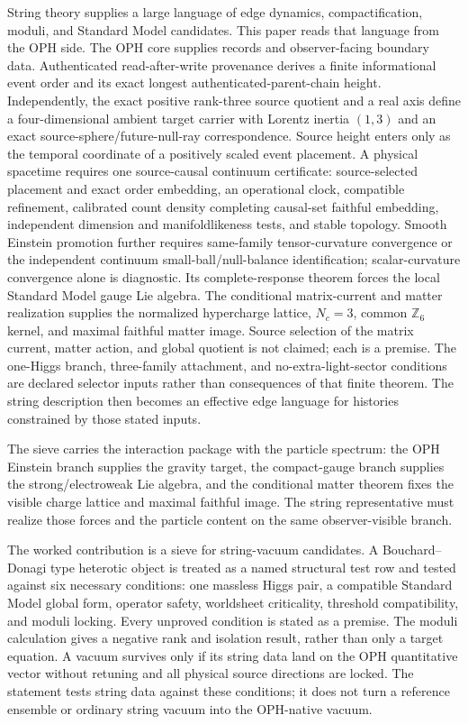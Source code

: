 \documentclass[11pt]{article}
\theoremstyle{remark}
\theoremstyle{plain}
\begin{document}
String theory supplies a large language of edge dynamics, compactification,
moduli, and Standard Model candidates. This paper reads that language from the
OPH side. The OPH core supplies records and observer-facing boundary data.
Authenticated read-after-write provenance derives a finite informational event
order and its exact longest authenticated-parent-chain height. Independently, the exact
positive rank-three source quotient and a real axis define a four-dimensional ambient target
carrier with Lorentz inertia \((1,3)\) and an exact source-sphere/future-null-ray
correspondence. Source height enters only as the temporal coordinate of a
positively scaled event placement. A physical spacetime requires one source-causal
continuum certificate: source-selected placement and exact order embedding,
an operational clock, compatible refinement, calibrated count density
completing causal-set faithful embedding, independent dimension and
manifoldlikeness tests, and stable topology. Smooth Einstein promotion further
requires same-family tensor-curvature convergence or the independent continuum
small-ball/null-balance identification; scalar-curvature convergence alone is
diagnostic. Its
complete-response theorem forces the local Standard Model gauge Lie algebra.
The conditional matrix-current and matter realization supplies the
normalized hypercharge lattice, \(N_c=3\), common \(\mathbb Z_6\) kernel, and
maximal faithful matter image. Source selection of the matrix current, matter
action, and global quotient is not claimed; each is a premise. The one-Higgs
branch, three-family attachment, and no-extra-light-sector conditions are declared selector
inputs rather than consequences of that finite theorem. The string description then becomes an
effective edge language for histories constrained by those stated inputs.

The sieve carries the interaction package with the particle spectrum:
the OPH Einstein branch supplies the gravity target, the compact-gauge branch supplies the
strong/electroweak Lie algebra, and the conditional matter theorem fixes the visible
charge lattice and maximal faithful image.
The string representative must realize those forces and the particle content on the same
observer-visible branch.

The worked contribution is a sieve for string-vacuum candidates. A
Bouchard--Donagi type heterotic object is treated as a named structural test row and
tested against six necessary conditions: one massless Higgs pair, a compatible Standard Model global form,
operator safety, worldsheet criticality, threshold compatibility, and moduli locking. Every
unproved condition is stated as a premise. The moduli calculation gives a negative rank and isolation result,
rather than only a target equation. A vacuum survives only if its string data land on the OPH
quantitative vector without retuning and all physical source directions are locked. The statement
tests string data against these conditions; it
does not turn a reference ensemble or ordinary string vacuum into the OPH-native vacuum.
\end{document}
